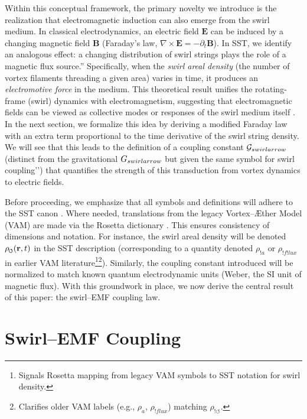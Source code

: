\documentclass[12pt]{article}
\DeclareRobustCommand{\swirlarrow}{
\mathchoice{\mkern-2mu\scriptstyle\boldsymbol{\circlearrowleft}}%
{\mkern-2mu\scriptstyle\boldsymbol{\circlearrowleft}}%
{\mkern-2mu\scriptscriptstyle\boldsymbol{\circlearrowleft}}%
{\mkern-2mu\scriptscriptstyle\boldsymbol{\circlearrowleft}}
}%
\begin{document}
Within this conceptual framework, the primary novelty we introduce is the realization that electromagnetic induction can also emerge from the swirl medium. In classical electrodynamics, an electric field $\mathbf{E}$ can be induced by a changing magnetic field $\mathbf{B}$ (Faraday’s law, $\nabla \times \mathbf{E} = -\partial_t \mathbf{B}$). In SST, we identify an analogous effect: a changing distribution of swirl strings plays the role of a magnetic flux source.'' Specifically, when the \emph{swirl areal density} (the number of vortex filaments threading a given area) varies in time, it produces an \emph{electromotive force} in the medium. This theoretical result unifies the rotating-frame (swirl) dynamics with electromagnetism, suggesting that electromagnetic fields can be viewed as collective modes or responses of the swirl medium itself \cite{Iskandarani2025RotatingFrame}. In the next section, we formalize this idea by deriving a modified Faraday law with an extra term proportional to the time derivative of the swirl string density. We will see that this leads to the definition of a coupling constant $\mathcal{G}_{\\swirlarrow}$ (distinct from the gravitational $G_{\\swirlarrow}$ but given the same symbol for swirl coupling’’) that quantifies the strength of this transduction from vortex dynamics to electric fields.


Before proceeding, we emphasize that all symbols and definitions will adhere to the SST canon \cite{Iskandarani2025Canon}. Where needed, translations from the legacy Vortex--Æther Model (VAM) are made via the Rosetta dictionary \cite{Iskandarani2025Rosetta}. This ensures consistency of dimensions and notation. For instance, the swirl areal density will be denoted $\rho_{\swirlarrow}(\mathbf{r},t)$ in the SST description (corresponding to a quantity denoted $\rho_{!a}$ or $\rho_{!f!lux}$ in earlier VAM literature\footnote{Signals Rosetta mapping from legacy VAM symbols to SST notation for swirl density.}\footnote{Clarifies older VAM labels (e.g., $\rho_a$, $\rho_{!flux}$) matching $\rho_{!\circlearrowleft}$.}). Similarly, the coupling constant introduced will be normalized to match known quantum electrodynamic units (Weber, the SI unit of magnetic flux). With this groundwork in place, we now derive the central result of this paper: the swirl–EMF coupling law.


\section{Swirl--EMF Coupling}\label{sec:swirlEMF}
\end{document}
